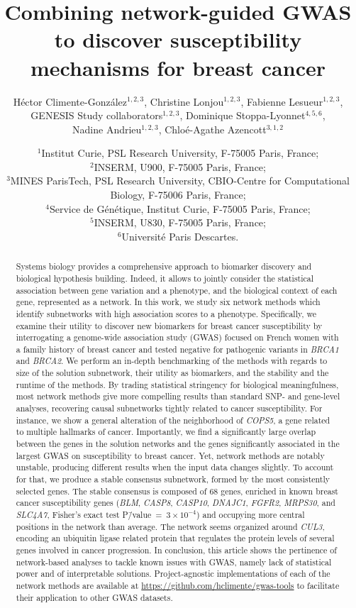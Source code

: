 \documentclass[draft,twocolumn, 11pt]{article}
\title{Combining network-guided GWAS to discover susceptibility mechanisms for breast cancer}
\author{Héctor Climente-González$^{1,2,3}$, Christine Lonjou$^{1,2,3}$, Fabienne Lesueur$^{1,2,3}$, \\
GENESIS Study collaborators$^{1,2,3}$, Dominique Stoppa-Lyonnet$^{4,5,6}$, \\
Nadine Andrieu$^{1,2,3}$, Chloé-Agathe Azencott$^{3,1,2}$}
\date{$^{1}$Institut Curie, PSL Research University, F-75005 Paris, France;\\
  $^{2}$INSERM, U900, F-75005 Paris, France;\\
  $^{3}$MINES ParisTech, PSL Research University, CBIO-Centre for Computational Biology, F-75006 Paris, France;\\
  $^{4}$Service de Génétique, Institut Curie, F-75005 Paris, France;\\
  $^{5}$INSERM, U830, F-75005 Paris, France;\\
  $^{6}$Université Paris Descartes.\\
}
\begin{document}
\onecolumn
\maketitle

\begin{abstract}
Systems biology provides a comprehensive approach to biomarker discovery and biological hypothesis building. Indeed, it allows to jointly consider the statistical association between gene variation and a phenotype, and the biological context of each gene, represented as a network. In this work, we study six network methods which identify subnetworks with high association scores to a phenotype. Specifically, we examine their utility to discover new biomarkers for breast cancer susceptibility by interrogating a genome-wide association study (GWAS) focused on French women with a family history of breast cancer and tested negative for pathogenic variants in \emph{BRCA1} and \emph{BRCA2}. We perform an in-depth benchmarking of the methods with regards to size of the solution subnetwork, their utility as biomarkers, and the stability and the runtime of the methods. By trading statistical stringency for biological meaningfulness, most network methods give more compelling results than standard SNP- and gene-level analyses, recovering causal subnetworks tightly related to cancer susceptibility. For instance, we show a general alteration of the neighborhood of \emph{COPS5}, a gene related to multiple hallmarks of cancer. Importantly, we find a significantly large overlap between the genes in the solution networks and the genes significantly associated in the largest GWAS on susceptibility to breast cancer. Yet, network methods are notably unstable, producing different results when the input data changes slightly. To account for that, we produce a stable consensus subnetwork, formed by the most consistently selected genes. The stable consensus is composed of 68 genes, enriched in known breast cancer susceptibility genes (\emph{BLM}, \emph{CASP8}, \emph{CASP10}, \emph{DNAJC1}, \emph{FGFR2}, \emph{MRPS30}, and \emph{SLC4A7}, Fisher's exact test P\=/value~=~$3 \times 10^{-4}$) and occupying more central positions in the network than average. The network seems organized around \emph{CUL3}, encoding an ubiquitin ligase related protein that regulates the protein levels of several genes involved in cancer progression. In conclusion, this article shows the pertinence of network-based analyses to tackle known issues with GWAS, namely lack of statistical power and of interpretable solutions. Project-agnostic implementations of each of the network methods are available at \url{https://github.com/hclimente/gwas-tools} to facilitate their application to other GWAS datasets.
\end{abstract}
\end{document}
